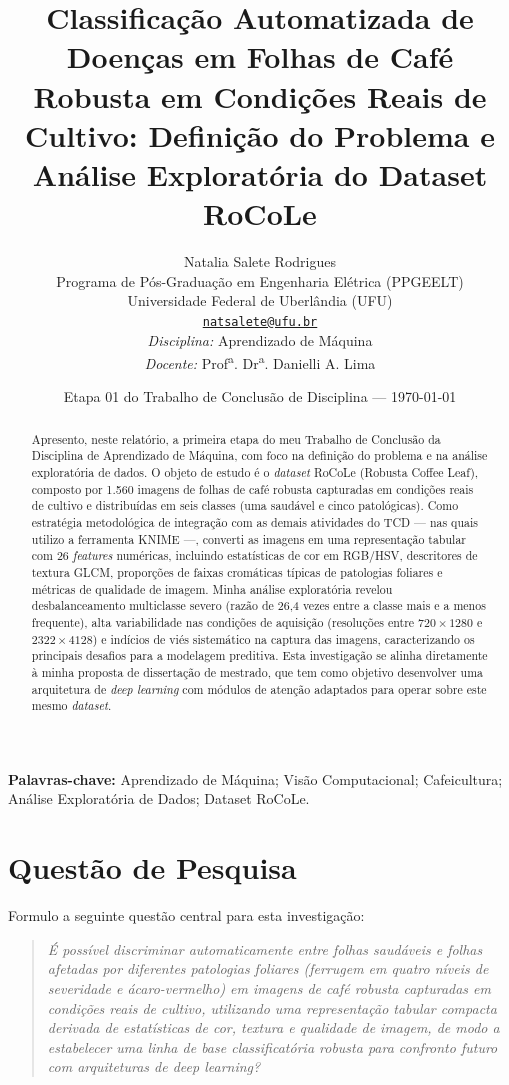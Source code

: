 \documentclass[11pt,a4paper]{article}
\title{\textbf{Classificação Automatizada de Doenças em Folhas de Café Robusta em Condições Reais de Cultivo: Definição do Problema e Análise Exploratória do Dataset RoCoLe}}
\author{
  Natalia Salete Rodrigues \\
  \small Programa de Pós-Graduação em Engenharia Elétrica (PPGEELT) \\
  \small Universidade Federal de Uberlândia (UFU) \\
  \small \href{mailto:natsalete@ufu.br}{\texttt{natsalete@ufu.br}} \\[4pt]
  \small \textit{Disciplina:} Aprendizado de Máquina \\
  \small \textit{Docente:} Prof\textsuperscript{a}. Dr\textsuperscript{a}. Danielli A. Lima
}
\date{\small Etapa 01 do Trabalho de Conclusão de Disciplina --- \today}
\begin{document}
\maketitle

\begin{abstract}
\noindent Apresento, neste relatório, a primeira etapa do meu Trabalho de Conclusão da Disciplina de Aprendizado de Máquina, com foco na definição do problema e na análise exploratória de dados. O objeto de estudo é o \textit{dataset} RoCoLe (Robusta Coffee Leaf), composto por 1.560 imagens de folhas de café robusta capturadas em condições reais de cultivo e distribuídas em seis classes (uma saudável e cinco patológicas). Como estratégia metodológica de integração com as demais atividades do TCD --- nas quais utilizo a ferramenta KNIME ---, converti as imagens em uma representação tabular com 26 \textit{features} numéricas, incluindo estatísticas de cor em RGB/HSV, descritores de textura GLCM, proporções de faixas cromáticas típicas de patologias foliares e métricas de qualidade de imagem. Minha análise exploratória revelou desbalanceamento multiclasse severo (razão de 26,4 vezes entre a classe mais e a menos frequente), alta variabilidade nas condições de aquisição (resoluções entre $720{\times}1280$ e $2322{\times}4128$) e indícios de viés sistemático na captura das imagens, caracterizando os principais desafios para a modelagem preditiva. Esta investigação se alinha diretamente à minha proposta de dissertação de mestrado, que tem como objetivo desenvolver uma arquitetura de \textit{deep learning} com módulos de atenção adaptados para operar sobre este mesmo \textit{dataset}.
\end{abstract}

\vspace{0.5em}
\noindent\textbf{Palavras-chave:} Aprendizado de Máquina; Visão Computacional; Cafeicultura; Análise Exploratória de Dados; Dataset RoCoLe.

\section{Questão de Pesquisa}

Formulo a seguinte questão central para esta investigação:

\begin{quote}
\textit{É possível discriminar automaticamente entre folhas saudáveis e folhas afetadas por diferentes patologias foliares (ferrugem em quatro níveis de severidade e ácaro-vermelho) em imagens de café robusta capturadas em condições reais de cultivo, utilizando uma representação tabular compacta derivada de estatísticas de cor, textura e qualidade de imagem, de modo a estabelecer uma linha de base classificatória robusta para confronto futuro com arquiteturas de \textit{deep learning}?}
\end{quote}
\end{document}
